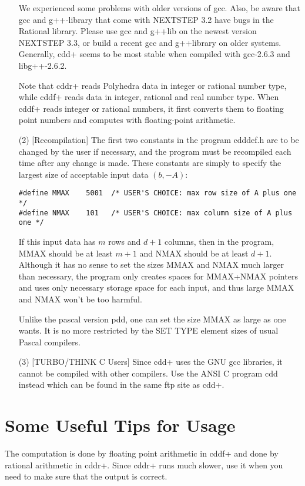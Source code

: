 \documentclass[11pt]{article}
\begin{document}
\begin{itemize}
We experienced some problems with older versions of gcc.    Also, be aware that
gcc and g++-library that come with NEXTSTEP 3.2 have bugs in the Rational library.
Please use gcc and g++lib on the newest version NEXTSTEP 3.3, or build a recent
gcc and g++library on older systems.
Generally, cdd+ seems to be most stable when compiled with gcc-2.6.3 
and libg++-2.6.2. 

Note that cddr+ reads Polyhedra data in integer or rational
number type, while cddf+ reads data in integer, rational and real number type.
When cddf+ reads integer or rational numbers, it first converts them
to floating point numbers and computes with floating-point arithmetic.

\item[(2)] [Recompilation] The first two constants in the program cdddef.h are to be 
changed by the user if necessary, and the program must be recompiled
each time after any change is made.   These constants are simply
to specify the largest size of acceptable input data $(b, -A)$: 
\begin{verbatim}
#define MMAX    5001  /* USER'S CHOICE: max row size of A plus one */
#define NMAX    101   /* USER'S CHOICE: max column size of A plus one */
\end{verbatim}
If this input data has $m$ rows and $d+1$ columns, then in the program,
MMAX should be at least $m+1$ and NMAX should be at least
$d+1$.  Although it has no sense to set the sizes MMAX and NMAX much larger
than necessary, the program only creates spaces for MMAX+NMAX pointers
and uses only necessary storage space for each input, and
thus large MMAX and NMAX won't be too harmful.

Unlike the pascal version pdd, one can set the size MMAX as large as one
wants.  It is no more restricted by the SET TYPE element sizes of 
usual Pascal compilers.

\item[(3)] [TURBO/THINK C Users]   Since cdd+ uses the GNU gcc libraries,
it cannot be compiled with other compilers.  Use  the ANSI C program cdd
instead which can be found in the same ftp site as cdd+.
\end{itemize}


\section{Some  Useful Tips for Usage}  \label{TIPS}

The computation is done by floating point arithmetic in cddf+ and
done by rational arithmetic in cddr+.    Since cddr+ runs much slower,
use it when you need to make sure that the output is correct.
\end{document}
